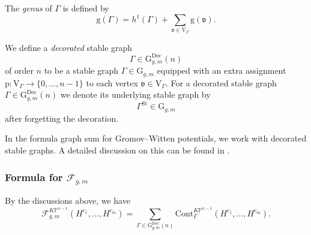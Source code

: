 \documentclass[12pt]{amsart}
\numberwithin{equation}{section}
\newcommand{\KP}{K\mathbb{P}}
\begin{document}
The \textit{genus} of $\Gamma$ is defined by
\begin{equation*}
\mathrm{g}(\Gamma)=h^1(\Gamma)+\sum_{\mathfrak{v}\in\mathrm{V}_{\Gamma}}\mathrm{g}(\mathfrak{v}).
\end{equation*}

We define a {\em decorated} stable graph $$\Gamma\in\mathrm{G}_{g,m}^{\text{Dec}}(n)$$ of order $n$ to be a stable graph $\Gamma\in\mathrm{G}_{g,m}$ equipped with an extra assignment $\mathrm{p}: \mathrm{V}_{\Gamma}\rightarrow \{0,...,n-1\}$ to each vertex $\mathfrak{v}\in\mathrm{V}_{\Gamma}$. For a decorated stable graph $\Gamma\in\mathrm{G}_{g,m}^{\text{Dec}}(n)$ we denote its underlying stable graph by $$\Gamma^{\mathrm{St}}\in\mathrm{G}_{g,m}$$ after forgetting the decoration.

In the formula graph sum for Gromov--Witten potentials, we work with decorated stable graphs. A detailed discussion on this can be found in \cite[Section 3.2]{gt}.

\subsubsection{Formula for \texorpdfstring{$\mathcal{F}_{g,m}$}{F{g,m}}}\label{sec:FgmKP}
By the discussions above, we have
\begin{equation}\label{eqn:formula_Fg}
\mathcal{F}_{g, m}^{\KP^{n-1}}\left(H^{c_{1}}, \ldots, H^{c_{m}}\right)=\sum_{\Gamma\in\mathrm{G}_{g,m}^{\text{Dec}}(n)}\mathrm{Cont}^{\KP^{n-1}}_{\Gamma}\left(H^{c_{1}}, \ldots, H^{c_{m}}\right).
\end{equation}
\end{document}
